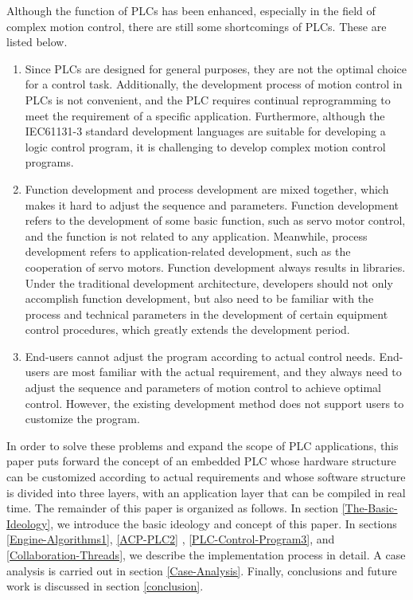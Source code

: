 \documentclass[journal]{IEEEtran}
\begin{document}
Although the function of PLCs has been enhanced, especially in the field of complex motion control, there are still some shortcomings of PLCs. These are listed below.
\begin{enumerate}
	\item Since PLCs are designed for general purposes, they are not the optimal choice for a control task. Additionally, the development process of motion control in PLCs is not convenient, and the PLC requires continual reprogramming to meet the requirement of a specific application. Furthermore, although the IEC61131-3 standard development languages are suitable for developing a logic control program, it is challenging to develop complex motion control programs.
	\item Function development and process development are mixed together, which makes it hard to adjust the sequence and parameters. Function development refers to the development of some basic function, such as servo motor control, and the function is not related to any application. Meanwhile, process development refers to application-related development, such as the cooperation of servo motors. Function development always results in libraries. Under the traditional development architecture, developers should not only accomplish function development, but also need to be familiar with the process and technical parameters in the development of certain equipment control procedures, which greatly extends the development period.
	\item End-users cannot adjust the program according to actual control needs. End-users are most familiar with the actual requirement, and they always need to adjust the sequence and parameters of motion control to achieve optimal control. However, the existing development method does not support users to customize the program.
\end{enumerate}

In order to solve these problems and expand the scope of PLC applications, this paper puts forward the concept of an embedded PLC whose hardware structure can be customized according to actual requirements and whose software structure is divided into three layers, with an application layer that can be compiled in real time. The remainder of this paper is organized as follows. In section \ref{The-Basic-Ideology}, we introduce the basic ideology and concept of this paper. In sections \ref{Engine-Algorithms1}, \ref{ACP-PLC2} , \ref{PLC-Control-Program3}, and \ref{Collaboration-Threads}, we describe the implementation process in detail. A case analysis is carried out in section \ref{Case-Analysis}. Finally, conclusions and future work is discussed in section \ref{conclusion}.
\end{document}

